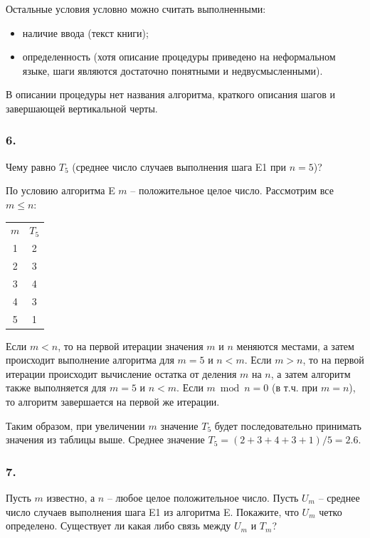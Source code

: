 \documentclass{book}
\begin{document}
Остальные условия условно можно считать выполненными:
\begin{itemize}
\item наличие ввода (текст книги);
\item определенность (хотя описание процедуры приведено на неформальном языке, шаги являются достаточно понятными и недвусмысленными).
\end{itemize}

В описании процедуры нет названия алгоритма, краткого описания шагов и завершающей вертикальной черты.

\subsubsection{6.}

Чему равно $T_5$ (среднее число случаев выполнения шага E1 при $n=5$)?

По условию алгоритма E $m$ -- положительное целое число. Рассмотрим все $ m \leq n$:

\begin{center}
\begin{tabular}{ c c }
 $m$ & $T_5$  \\ 
 1 & 2  \\  
 2 & 3  \\
 3 & 4  \\
 4 & 3  \\
 5 & 1  \\
\end{tabular}
\end{center}

Если $m < n$, то на первой итерации значения $m$ и $n$ меняются местами, а затем происходит выполнение алгоритма для $m=5$ и $n < m$.
Если $m > n$, то на первой итерации происходит вычисление остатка от деления $m$  на $n$, а затем алгоритм также выполняется для $m=5$ и $n < m$.
Если $m \bmod n = 0$ (в т.ч. при $m=n$), то алгоритм завершается на первой же итерации.

Таким образом, при увеличении $m$ значение $T_5$ будет последовательно принимать значения из таблицы выше. Среднее значение $T_5 = (2+3+4+3+1)/5 = 2.6$.

\subsubsection{7.}

Пусть $m$ известно, а $n$ -- любое целое положительное число. Пусть $U_m$ -- среднее число случаев выполнения шага E1 из алгоритма E. Покажите, что $U_m$ четко определено. Существует ли какая либо связь между $U_m$ и $T_m$?
\end{document}
